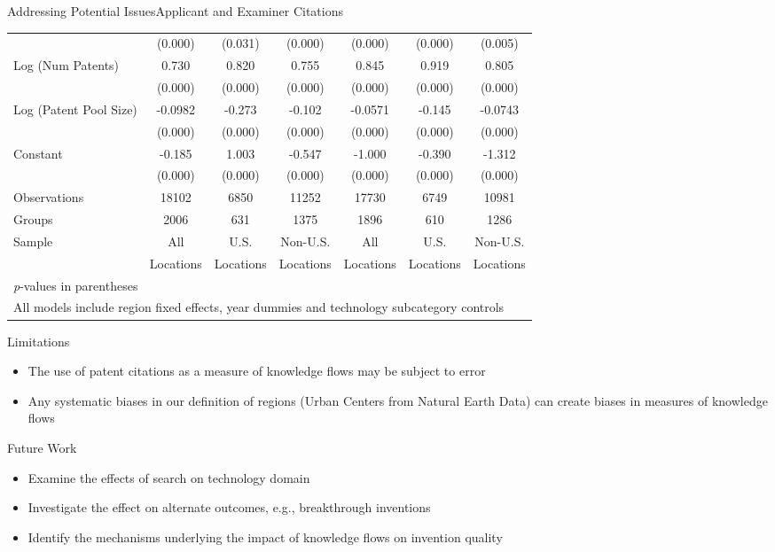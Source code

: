 \documentclass{beamer}
\begin{document}
\begin{frame}{Addressing Potential Issues}{Applicant and Examiner Citations}
{\begin{tabular}{l*{6}{c}}
                &  (0.000)&  (0.031)&  (0.000)&  (0.000)&  (0.000)&  (0.005)\\
Log (Num Patents)&    0.730&    0.820&    0.755&    0.845&    0.919&    0.805\\
                &  (0.000)&  (0.000)&  (0.000)&  (0.000)&  (0.000)&  (0.000)\\
Log (Patent Pool Size)&  -0.0982&   -0.273&   -0.102&  -0.0571&   -0.145&  -0.0743\\
                &  (0.000)&  (0.000)&  (0.000)&  (0.000)&  (0.000)&  (0.000)\\
Constant        &   -0.185&    1.003&   -0.547&   -1.000&   -0.390&   -1.312\\
                &  (0.000)&  (0.000)&  (0.000)&  (0.000)&  (0.000)&  (0.000)\\
\hline
Observations    &    18102&     6850&    11252&    17730&     6749&    10981\\
Groups          &     2006&      631&     1375&     1896&      610&     1286\\
Sample&All &U.S. &Non-U.S.&All &U.S. &Non-U.S. \\
          &Locations &Locations&Locations&Locations &Locations&Locations \\\hline\hline
\multicolumn{7}{l}{\footnotesize \textit{p}-values in parentheses}\\
\multicolumn{7}{l}{\footnotesize All models include region fixed effects, year dummies and technology subcategory controls}\\
\end{tabular}
}
\end{frame}

\begin{frame}{Limitations}{}
\begin{itemize}
\item{The use of patent citations as a measure of knowledge flows may be subject to error \citep{Arora2017a}}
\item{Any systematic biases in our definition of regions (Urban Centers from Natural Earth Data) can create biases in measures of knowledge flows}
\end{itemize}
\end{frame}

\begin{frame}{Future Work}{}
\begin{itemize}
\item{Examine the effects of search on technology domain \citep{Rosenkopf2001}}
\item{Investigate the effect on alternate outcomes, e.g., breakthrough inventions}
\item{Identify the mechanisms underlying the impact of knowledge flows on invention quality}
\end{itemize}
\end{frame}



\end{document}
